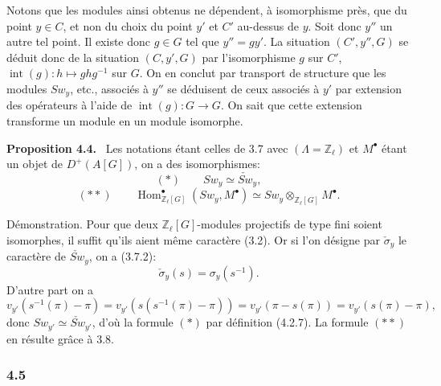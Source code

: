 \documentclass[11pt]{article}
\newenvironment{statement}[1]{\par\medskip\noindent\textbf{#1.}\ }{\par\medskip}
\DeclareMathOperator{\Hom}{Hom}
\providecommand{\Hom}{\operatorname{Hom}}
\providecommand{\Hom}{\operatorname{Hom}}
\begin{document}
Notons que les modules ainsi obtenus ne dépendent, à isomorphisme près, que du point $y\in C$, et non du choix du point $y'$ et $C'$ au-dessus de $y$. Soit donc $y''$ un autre tel point. Il existe donc $g\in G$ tel que $y''=g y'$. La situation $(C',y'',G)$ se déduit donc de la situation $(C,y',G)$ par l'isomorphisme $g$ sur $C'$, $\operatorname{int}(g):h\mapsto ghg^{-1}$ sur $G$. On en conclut par transport de structure que les modules $Sw_y$, etc., associés à $y''$ se déduisent de ceux associés à $y'$ par extension des opérateurs à l'aide de $\operatorname{int}(g):G\to G$. On sait que cette extension transforme un module en un module isomorphe.

\begin{statement}{Proposition 4.4}
Les notations étant celles de 3.7 avec $(\Lambda=\mathbb Z_\ell)$ et $M^\bullet$ étant un objet de $D^+(A[G])$, on a des isomorphismes:
\[
(*)\qquad Sw_y\simeq \check{Sw}_y,
\]
\[
(**)\qquad
\Hom^\bullet_{\mathbb Z_\ell[G]}(Sw_y,M^\bullet)
\simeq Sw_y\otimes_{\mathbb Z_\ell[G]}M^\bullet.
\]
\end{statement}

Démonstration. Pour que deux $\mathbb Z_\ell[G]$-modules projectifs de type fini soient isomorphes, il suffit qu'ils aient même caractère (3.2). Or si l'on désigne par $\check\sigma_y$ le caractère de $\check{Sw}_y$, on a (3.7.2):
\[
\check\sigma_y(s)=\sigma_y(s^{-1}).
\]
D'autre part on a
\[
v_{y'}(s^{-1}(\pi)-\pi)
=v_{y'}(s(s^{-1}(\pi)-\pi))
=v_{y'}(\pi-s(\pi))
=v_{y'}(s(\pi)-\pi),
\]
donc $Sw_{y'}\simeq\check{Sw}_{y'}$, d'où la formule $(*)$ par définition (4.2.7). La formule $(**)$ en résulte grâce à 3.8.

\subsubsection*{4.5}
\end{document}
